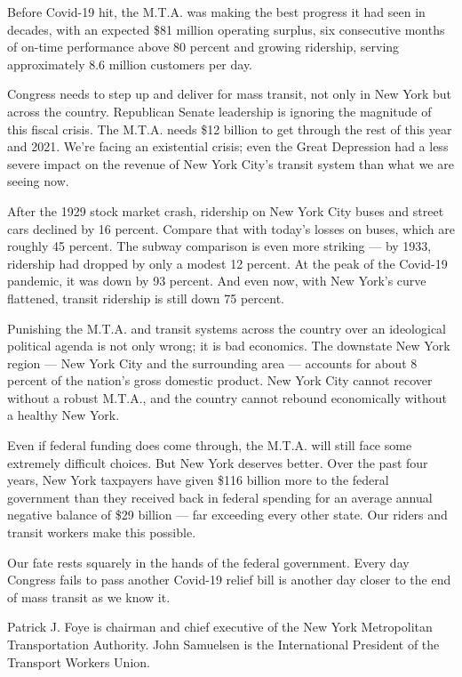 Before Covid-19 hit, the M.T.A. was making the best progress it had seen
in decades, with an expected \$81 million operating surplus, six
consecutive months of on-time performance above 80 percent and growing
ridership, serving approximately 8.6 million customers per day.

Congress needs to step up and deliver for mass transit, not only in New
York but across the country. Republican Senate leadership is ignoring
the magnitude of this fiscal crisis. The M.T.A. needs \$12 billion to
get through the rest of this year and 2021. We're facing an existential
crisis; even the Great Depression had a less severe impact on the
revenue of New York City's transit system than what we are seeing now.

After the 1929 stock market crash, ridership on New York City buses and
street cars declined by 16 percent. Compare that with today's losses on
buses, which are roughly 45 percent. The subway comparison is even more
striking --- by 1933, ridership had dropped by only a modest 12 percent.
At the peak of the Covid-19 pandemic, it was down by 93 percent. And
even now, with New York's curve flattened, transit ridership is still
down 75 percent.

Punishing the M.T.A. and transit systems across the country over an
ideological political agenda is not only wrong; it is bad economics. The
downstate New York region --- New York City and the surrounding area ---
accounts for about 8 percent of the nation's gross domestic product. New
York City cannot recover without a robust M.T.A., and the country cannot
rebound economically without a healthy New York.

Even if federal funding does come through, the M.T.A. will still face
some extremely difficult choices. But New York deserves better. Over the
past four years, New York taxpayers have given \$116 billion more to the
federal government than they received back in federal spending for an
average annual negative balance of \$29 billion --- far exceeding every
other state. Our riders and transit workers make this possible.

Our fate rests squarely in the hands of the federal government. Every
day Congress fails to pass another Covid-19 relief bill is another day
closer to the end of mass transit as we know it.

Patrick J. Foye is chairman and chief executive of the New York
Metropolitan Transportation Authority. John Samuelsen is the
International President of the Transport Workers Union.

